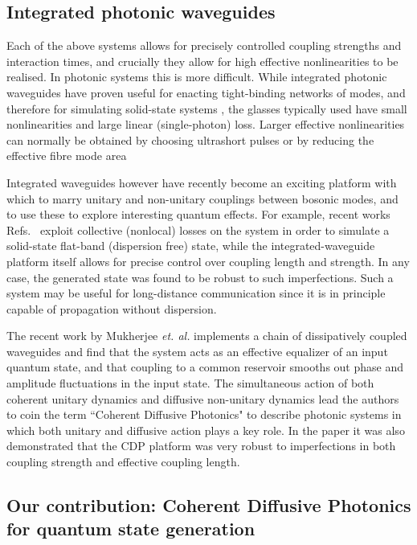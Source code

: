 \subsection{Integrated photonic waveguides}

Each of the above systems allows for precisely controlled coupling strengths and interaction times, and crucially they allow for high effective nonlinearities to be realised. In photonic systems this is more difficult. While integrated photonic waveguides have proven useful for enacting tight-binding networks of modes, and therefore for simulating solid-state systems \cite{Mukherjee2015, Vicencio2015}, the glasses typically used have small nonlinearities and large linear (single-photon) loss. Larger effective nonlinearities can normally be obtained by choosing ultrashort pulses or by reducing the effective fibre mode area \cite{Agrawal2007, Agrawal2001}


Integrated waveguides however have recently become an exciting platform with which to marry unitary and non-unitary couplings between bosonic modes, and to use these to explore interesting quantum effects. For example, recent works Refs.~\cite{Mukherjee2015, Vicencio2015} exploit collective (nonlocal) losses on the system in order to simulate a solid-state flat-band (dispersion free) state, while the integrated-waveguide platform itself allows for precise control over coupling length and strength. In any case, the generated state was found to be robust to such imperfections. Such a system may be useful for long-distance communication since it is in principle capable of propagation without dispersion.

The recent work by Mukherjee \emph{et. al.} \cite{Mukherjee2017} implements a chain of dissipatively coupled waveguides and find that the system acts as an effective equalizer of an input quantum state, and that coupling to a common reservoir smooths out phase and amplitude fluctuations in the input state. The simultaneous action of both coherent unitary dynamics and diffusive non-unitary dynamics lead the authors to coin the term ``Coherent Diffusive Photonics" to describe photonic systems in which both unitary and diffusive action plays a key role. In the paper it was also demonstrated that the CDP platform was very robust to imperfections in both coupling strength and effective coupling length.

\subsection{Our contribution: Coherent Diffusive Photonics for quantum state generation}


